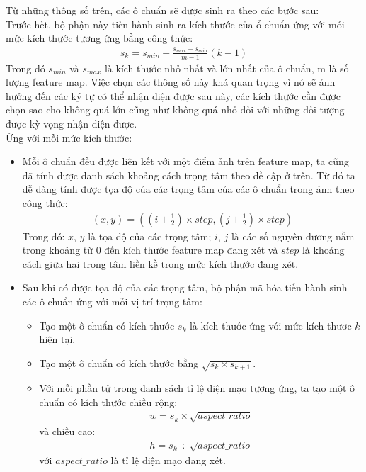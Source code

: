 \documentclass[a4paper,12pt]{article}
\begin{document}
	Từ những thông số trên, các ô chuẩn sẽ được sinh ra theo các bước sau: \\
	Trước hết, bộ phận này tiến hành sinh ra kích thước của ổ chuẩn ứng với mỗi mức kích thước tương ứng bằng công thức: 
	\begin{align}
	s_k = s_{min} + \frac{s_{max} - s_{min}}{m - 1}(k - 1) 
	\end{align}
	Trong đó $s_{min}$ và $s_{max}$ là kích thước nhỏ nhất và lớn nhất của ô chuẩn, m là số lượng feature map. Việc chọn các thông số này khá quan trọng vì nó sẽ ảnh hưởng đến các ký tự có thể nhận diện được sau này, các kích thước cần được chọn sao cho không quá lớn cũng như không quá nhỏ đối với những đối tượng được kỳ vọng nhận diện được.\\
	
	Ứng với mỗi mức kích thước:
	
	\begin{itemize}
		
		\item Mỗi ô chuẩn đều được liên kết với một điểm ảnh trên feature map, ta cũng đã tính được danh sách khoảng cách trọng tâm theo đề cập ở trên. Từ đó ta dễ dàng tính được tọa độ của các trọng tâm của các ô chuẩn trong ảnh theo công thức:
		\begin{align}
		(x, y) =\left( \left(i + \frac{1}{2} \right) \times step, \left(j + \frac{1}{2} \right) \times step \right)
		\end{align}
		Trong đó: $x$, $y$ là tọa độ của các trọng tâm; $i$, $j$ là các số nguyên dương nằm trong khoảng từ 0 đến kích thước feature map đang xét và $step$ là khoảng cách giữa hai trọng tâm liền kề trong mức kích thước đang xét.
		
		\item Sau khi có được tọa độ của các trọng tâm, bộ phận mã hóa tiến hành sinh các ô chuẩn ứng với mỗi vị trí trọng tâm: 
		
		\begin{itemize}
			\item Tạo một ô chuẩn có kích thước $s_k$ là kích thước ứng với mức kích thươc $k$ hiện tại.
			\item Tạo một ô chuẩn có kích thước bằng $\sqrt{s_k \times s_{k + 1}}$.
			\item Với mỗi phần tử trong danh sách tỉ lệ diện mạo tương ứng, ta tạo một ô chuẩn có kích thước chiều rộng: 
			\begin{align}
			w = s_k \times \sqrt{aspect\_ratio}
			\end{align} 
			và chiều cao:
			\begin{align}
			h = s_k \div \sqrt{aspect\_ratio}
			\end{align}
			với $aspect\_ratio$ là tỉ lệ diện mạo đang xét.
		\end{itemize}
		
	\end{itemize}
	
\end{document}
